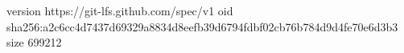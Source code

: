 version https://git-lfs.github.com/spec/v1
oid sha256:a2c6cc4d7437d69329a8834d8eefb39d6794fdbf02cb76b784d9d4fe70e6d3b3
size 699212
